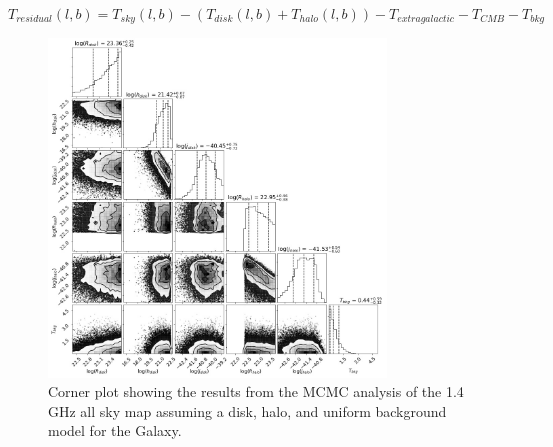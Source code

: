\documentclass[%
onecolumn,
11pt,
tightenlines,
notitlepage,
superscriptaddress,
nofootinbib,
amsmath,amssymb,
aps,
pra,
]{revtex4-1}
\begin{document}
\begin{equation}
T_{residual}(l,b) = T_{sky}(l,b) - \left(T_{disk}(l,b) + T_{halo}(l,b)\right) - T_{extragalactic} - T_{CMB} - T_{bkg}
\label{T_res}
\end{equation}

\begin{figure}[b]
\begin{center}
\includegraphics[width=0.8\textwidth]{corner_disk+halo+bkg.jpg}
\caption{Corner plot showing the results from the MCMC analysis of the 1.4 GHz all sky map assuming a disk, halo, and uniform background model for the Galaxy.}
\label{corner_disk+halo+bkg}
\end{center}
\end{figure}
\end{document}

